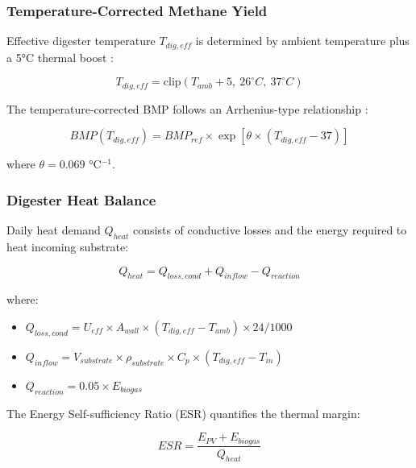 \documentclass[12pt, a4paper]{article}
\begin{document}
\subsubsection{Temperature-Corrected Methane Yield}

Effective digester temperature $T_{dig,eff}$ is determined by ambient temperature plus a 5°C thermal boost \cite{lindorfer2008}:

\begin{equation}
T_{dig,eff} = \text{clip}(T_{amb} + 5,\ 26^\circ C,\ 37^\circ C)
\label{eq:tdig}
\end{equation}

The temperature-corrected BMP follows an Arrhenius-type relationship \cite{lindorfer2008, pilarski2025}:

\begin{equation}
BMP(T_{dig,eff}) = BMP_{ref} \times \exp\left[\theta \times (T_{dig,eff} - 37)\right]
\label{eq:bmparrhenius}
\end{equation}

where $\theta = 0.069$ °C$^{-1}$.

\subsubsection{Digester Heat Balance}

\hspace{1cm}Daily heat demand $Q_{heat}$ consists of conductive losses and the energy required to heat incoming substrate:

\begin{equation}
Q_{heat} = Q_{loss,cond} + Q_{inflow} - Q_{reaction}
\label{eq:qheat}
\end{equation}

where:
\begin{itemize}[leftmargin=*]
    \item $Q_{loss,cond} = U_{eff} \times A_{wall} \times (T_{dig,eff} - T_{amb}) \times 24/1000$
    \item $Q_{inflow} = V_{substrate} \times \rho_{substrate} \times C_p \times (T_{dig,eff} - T_{in})$
    \item $Q_{reaction} = 0.05 \times E_{biogas}$ \cite{pal2024}
\end{itemize}

The Energy Self-sufficiency Ratio (ESR) quantifies the thermal margin:

\begin{equation}
ESR = \frac{E_{PV} + E_{biogas}}{Q_{heat}}
\label{eq:esr}
\end{equation}
\end{document}
